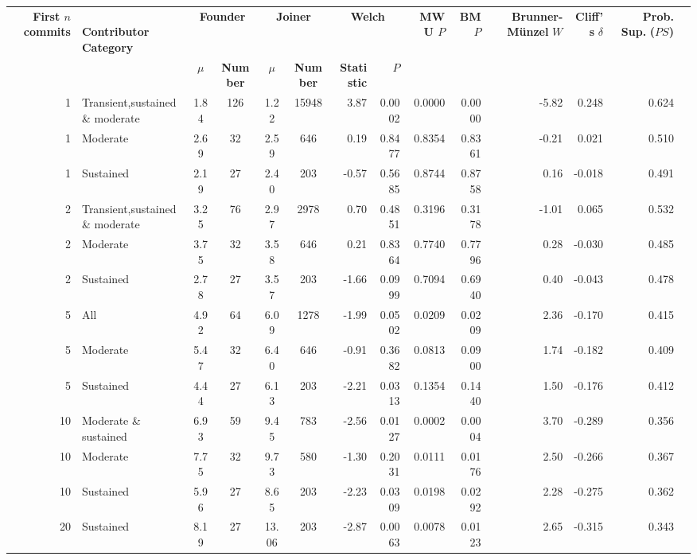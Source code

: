 \begin{landscape}
\begin{table}[H]
\begin{tabular}{r p{4cm} c c c c r r r r r r r r}
\toprule
\makecell[t]{\textbf{First $n$}\\\textbf{commits}} & \makecell[t]{\textbf{}\\\textbf{Contributor}\\\textbf{Category}} & \multicolumn{2}{c}{\textbf{Founder}} & \multicolumn{2}{c}{\textbf{Joiner}} & \multicolumn{2}{c}{\textbf{Welch}} & \textbf{MWU $P$} & \textbf{BM $P$} & \makecell[t]{\textbf{}\\\textbf{Brunner-Münzel}\\\textbf{$W$}} & \makecell[t]{\textbf{Cliff's}\\\textbf{$\delta$}} & \makecell[t]{\textbf{Prob. Sup.}\\\textbf{($PS$)}} \\ 
\cmidrule(lr){3-4} \cmidrule(lr){5-6} \cmidrule(lr){7-8}
 &  & \textbf{$\mu$} & \textbf{Number} & \textbf{$\mu$} & \textbf{Number} & \textbf{Statistic} & \textbf{$P$} &  &  &  &  &  \\ 
\midrule
1 & Transient,sustained \& moderate &  1.84 & 126 & 1.22 & 15948 & 3.87 & 0.0002 & 0.0000 & 0.0000 & -5.82 & 0.248 & 0.624 \\ 
1 & Moderate &  2.69 & 32 & 2.59 & 646 & 0.19 & 0.8477 & 0.8354 & 0.8361 & -0.21 & 0.021 & 0.510 \\ 
1 & Sustained &  2.19 & 27 & 2.40 & 203 & -0.57 & 0.5685 & 0.8744 & 0.8758 & 0.16 & -0.018 & 0.491 \\ 
2 & Transient,sustained \& moderate &  3.25 & 76 & 2.97 & 2978 & 0.70 & 0.4851 & 0.3196 & 0.3178 & -1.01 & 0.065 & 0.532 \\ 
2 & Moderate &  3.75 & 32 & 3.58 & 646 & 0.21 & 0.8364 & 0.7740 & 0.7796 & 0.28 & -0.030 & 0.485 \\ 
2 & Sustained &  2.78 & 27 & 3.57 & 203 & -1.66 & 0.0999 & 0.7094 & 0.6940 & 0.40 & -0.043 & 0.478 \\ 
5 & All &  4.92 & 64 & 6.09 & 1278 & -1.99 & 0.0502 & 0.0209 & 0.0209 & 2.36 & -0.170 & 0.415 \\ 
5 & Moderate &  5.47 & 32 & 6.40 & 646 & -0.91 & 0.3682 & 0.0813 & 0.0900 & 1.74 & -0.182 & 0.409 \\ 
5 & Sustained &  4.44 & 27 & 6.13 & 203 & -2.21 & 0.0313 & 0.1354 & 0.1440 & 1.50 & -0.176 & 0.412 \\ 
10 & Moderate \& sustained &  6.93 & 59 & 9.45 & 783 & -2.56 & 0.0127 & 0.0002 & 0.0004 & 3.70 & -0.289 & 0.356 \\ 
10 & Moderate &  7.75 & 32 & 9.73 & 580 & -1.30 & 0.2031 & 0.0111 & 0.0176 & 2.50 & -0.266 & 0.367 \\ 
10 & Sustained &  5.96 & 27 & 8.65 & 203 & -2.23 & 0.0309 & 0.0198 & 0.0292 & 2.28 & -0.275 & 0.362 \\ 
20 & Sustained &  8.19 & 27 & 13.06 & 203 & -2.87 & 0.0063 & 0.0078 & 0.0123 & 2.65 & -0.315 & 0.343 \\ 
\bottomrule
\end{tabular}%
\label{tab:codebase_graph_latex_repository_graph_component_time_series_statistical_significance_test_packages_previous} 
\end{table}
\end{landscape}
\newpage 
